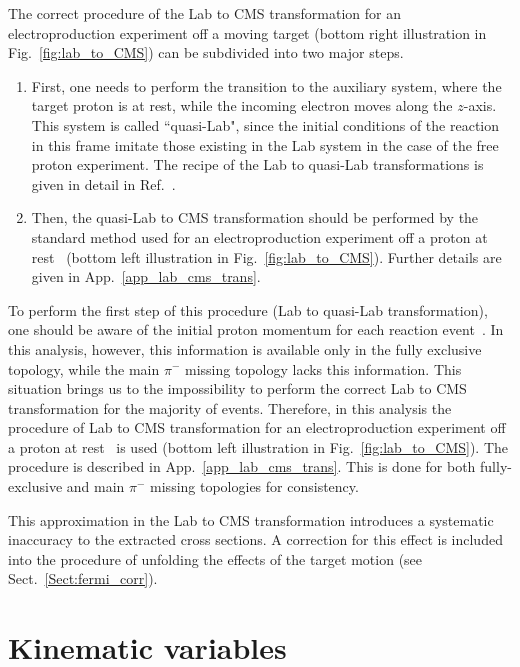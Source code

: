 The correct procedure of the Lab to CMS transformation for an electroproduction experiment off a moving target (bottom right illustration in Fig.~\ref{fig:lab_to_CMS}) can be subdivided into two major steps.

\begin{enumerate}
\item First, one needs to perform the transition to the auxiliary system, where the target proton is at rest, while the incoming electron moves along the $z$-axis. This system is called ``quasi-Lab", since the initial conditions of the reaction in this frame imitate those existing in the Lab system in the case of the free proton experiment. The recipe of the Lab to quasi-Lab transformations is given in detail in Ref.~\cite{twopeg-d}.

\item Then, the quasi-Lab to CMS transformation should be performed by the standard method used for an electroproduction experiment off a proton at rest~\cite{Fed_an_note:2017} (bottom left illustration in Fig.~\ref{fig:lab_to_CMS}). Further details are given in App.~\ref{app_lab_cms_trans}.
\end{enumerate}


To perform the first step of this procedure (Lab to quasi-Lab transformation), one should be aware of the initial proton momentum for each reaction event~\cite{twopeg-d}. In this analysis, however, this information is available only in the fully exclusive topology, while the main $\pi^{-}$ missing topology lacks this information. This situation brings us to the impossibility to perform the correct Lab to CMS transformation for the majority of events. Therefore, in this analysis the procedure of Lab to CMS transformation for an electroproduction experiment off a proton at rest~\cite{Fed_an_note:2017} is used (bottom left illustration in Fig.~\ref{fig:lab_to_CMS}). The procedure is described in App.~\ref{app_lab_cms_trans}. This is done for both fully-exclusive and main $\pi^{-}$ missing topologies for consistency.

This approximation in the Lab to CMS transformation introduces a systematic inaccuracy to the extracted cross sections. A correction for this effect is included into the procedure of unfolding the effects of the target motion (see Sect.~\ref{Sect:fermi_corr}).






\clearpage


\section{Kinematic variables}
\label{Sect:kin_var}


